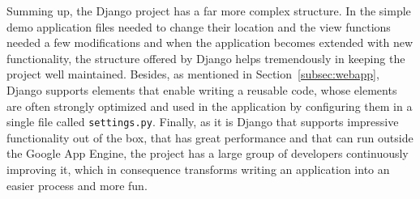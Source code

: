 Summing up, the Django project has a far more complex structure. In the simple demo application files needed to change their location and the view functions needed a few modifications and when the application becomes extended with new functionality, the structure offered by Django helps tremendously in keeping the project well maintained. Besides, as mentioned in Section~\ref{subsec:webapp}, Django supports elements that enable writing a reusable code, whose elements are often strongly optimized and used in the application by configuring them in a single file called \texttt{settings.py}. Finally, as it is Django that supports impressive functionality out of the box, that has great performance and that can run outside the Google App Engine, the project has a large group of developers continuously improving it, which in consequence transforms writing an application into an easier process and more fun. 
